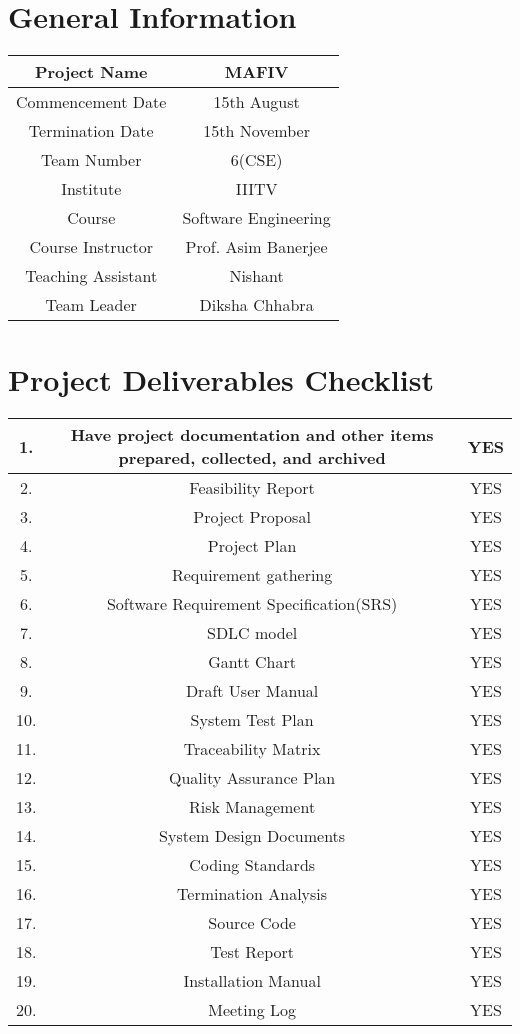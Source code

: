 \documentclass{article}
\begin{document}
\section{General Information}
\begin{center}
\begin{tabular}{|c|c|}
\hline
Project Name & MAFIV \\ \hline
Commencement Date & 15th August \\ \hline
Termination Date & 15th November \\ \hline
Team Number & 6(CSE) \\ \hline
Institute & IIITV \\ \hline
Course & Software Engineering \\ \hline
Course Instructor & Prof. Asim Banerjee \\ \hline
Teaching Assistant & Nishant \\ \hline
Team Leader & Diksha Chhabra \\ \hline
\end{tabular}
\end{center}

\section{Project Deliverables Checklist}

\begin{center}
\begin{tabular}{|c|c|c|}
\hline
1. & Have project documentation and other items prepared, collected, and
archived & YES \\ \hline
2. & Feasibility Report & YES \\ \hline
3. & Project Proposal & YES \\ \hline
4. & Project Plan & YES \\ \hline
5. & Requirement gathering & YES \\ \hline
6. & Software Requirement Specification(SRS) & YES \\ \hline
7. & SDLC model & YES \\ \hline
8. & Gantt Chart & YES \\ \hline
9. & Draft User Manual & YES \\ \hline
10. & System Test Plan & YES \\ \hline
11. & Traceability Matrix & YES \\ \hline
12. & Quality Assurance Plan & YES \\ \hline
13. & Risk Management & YES \\ \hline
14. & System Design Documents & YES \\ \hline
15. & Coding Standards & YES \\ \hline
16. & Termination Analysis & YES \\ \hline
17. & Source Code & YES \\ \hline
18. & Test Report & YES \\ \hline
19. & Installation Manual & YES \\ \hline
20. & Meeting Log & YES \\ \hline
\end{tabular}
\end{center}
\end{document}
